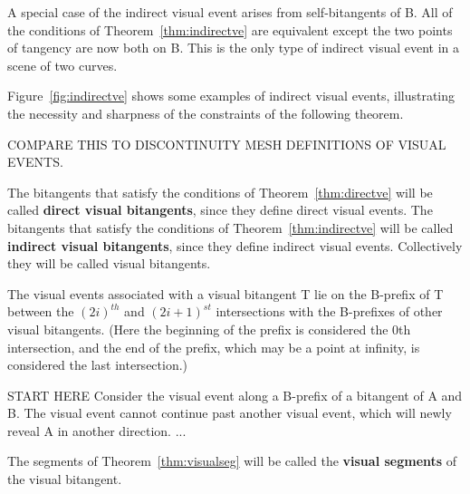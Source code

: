 \documentclass[12pt]{article}
\begin{document}
A special case of the indirect visual event arises from self-bitangents of B.
All of the conditions of Theorem~\ref{thm:indirectve} are equivalent 
except the two points of tangency are now both on B.
This is the only type of indirect visual event in a scene of two curves.

Figure~\ref{fig:indirectve} shows some examples of indirect visual events,
illustrating the necessity and sharpness of the constraints of the following theorem.




COMPARE THIS TO DISCONTINUITY MESH DEFINITIONS OF VISUAL EVENTS.

\clearpage

\begin{defn2}
The bitangents that satisfy the conditions of Theorem~\ref{thm:directve}
will be called {\bf direct visual bitangents},
since they define direct visual events.
The bitangents that satisfy the conditions of Theorem~\ref{thm:indirectve}
will be called {\bf indirect visual bitangents},
since they define indirect visual events.
Collectively they will be called visual bitangents.
\end{defn2}


\begin{theorem}
\label{thm:visualseg}
The visual events associated with a visual bitangent T lie on %
the B-prefix of T %
between the $(2i)^{th}$ and $(2i+1)^{st}$ intersections with the B-prefixes
of other visual bitangents.
(Here the beginning of the prefix is considered the 0th intersection,
and the end of the prefix, which may be a point at infinity, 
is considered the last intersection.)
\end{theorem}
\prf
START HERE
Consider the visual event along a B-prefix of a bitangent of A and B.
The visual event cannot continue past another visual event, 
which will newly reveal A in another direction.
...
\QED

\begin{defn2}
The segments of Theorem~\ref{thm:visualseg} will be called the 
{\bf visual segments} of the visual bitangent.
\end{defn2}
\end{document}
